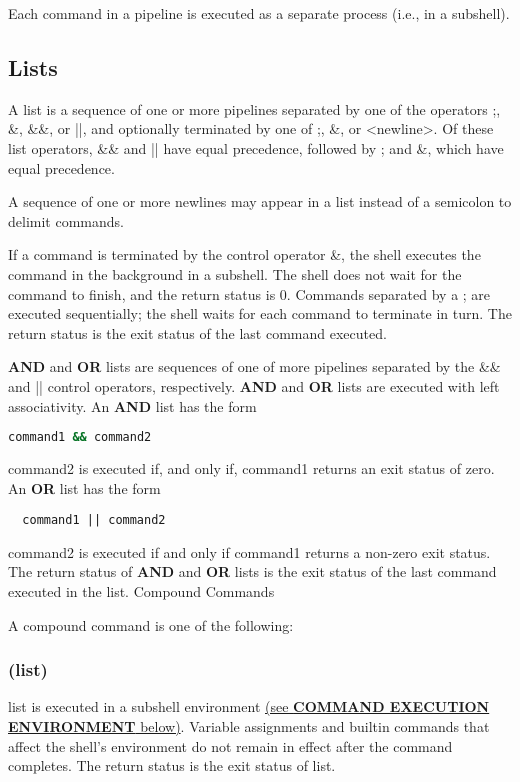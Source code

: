 Each command in a pipeline is executed as a separate process (i.e., in a subshell).

\subsection{Lists}

A list is a sequence of one or more pipelines separated by one of the operators ;, \&, \&\&, or ||, and optionally terminated by one of ;, \&, or <newline>.
Of these list operators, \&\& and || have equal precedence, followed by ; and \&, which have equal precedence.

A sequence of one or more newlines may appear in a list instead of a semicolon to delimit commands.

If a command is terminated by the control operator \&, the shell executes the command in the background in a subshell. The shell does not wait for the command to finish, and the return status is 0. Commands separated by a ; are executed sequentially; the shell waits for each command to terminate in turn. The return status is the exit status of the last command executed.

\textbf{AND} and \textbf{OR} lists are sequences of one of more pipelines separated by the \&\& and || control operators, respectively. \textbf{AND} and \textbf{OR} lists are executed with left associativity. An \textbf{AND} list has the form

\begin{lstlisting}[language=bash]
  command1 && command2
\end{lstlisting}
command2 is executed if, and only if, command1 returns an exit status of zero.
An \textbf{OR} list has the form

\begin{lstlisting}
  command1 || command2
\end{lstlisting}
command2 is executed if and only if command1 returns a non-zero exit status. The return status of \textbf{AND} and \textbf{OR} lists is the exit status of the last command executed in the list.
Compound Commands

A compound command is one of the following:
\subsubsection*{(list)}
list is executed in a subshell environment \hyperref[sec:commandexecutionenvironment]{(see \textbf{COMMAND EXECUTION ENVIRONMENT} below)}. Variable assignments and builtin commands that affect the shell's environment do not remain in effect after the command completes. The return status is the exit status of list.

